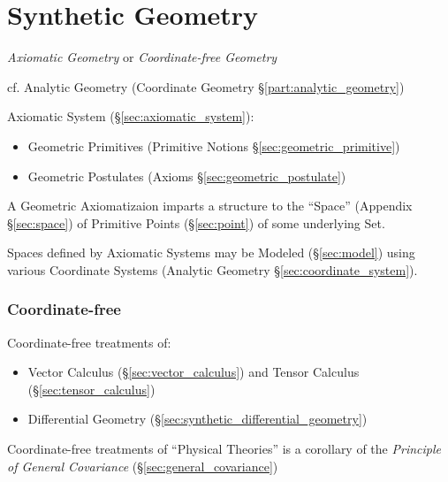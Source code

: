 \part{Synthetic Geometry}\label{part:synthetic_geometry}

\emph{Axiomatic Geometry} or \emph{Coordinate-free Geometry}

\fist cf. Analytic Geometry (Coordinate Geometry \S\ref{part:analytic_geometry})

Axiomatic System (\S\ref{sec:axiomatic_system}):
\begin{itemize}
  \item Geometric Primitives (Primitive Notions \S\ref{sec:geometric_primitive})
  \item Geometric Postulates (Axioms \S\ref{sec:geometric_postulate})
\end{itemize}
A Geometric Axiomatizaion imparts a structure to the ``Space'' (Appendix
\S\ref{sec:space}) of Primitive Points (\S\ref{sec:point}) of some underlying
Set.

\fist Spaces defined by Axiomatic Systems may be Modeled (\S\ref{sec:model})
using various Coordinate Systems (Analytic Geometry
\S\ref{sec:coordinate_system}).



\section{Coordinate-free}\label{sec:coordinate_free}

Coordinate-free treatments of:
\begin{itemize}
  \item Vector Calculus (\S\ref{sec:vector_calculus}) and Tensor Calculus
    (\S\ref{sec:tensor_calculus})
  \item Differential Geometry (\S\ref{sec:synthetic_differential_geometry})
\end{itemize}

Coordinate-free treatments of ``Physical Theories'' is a corollary of the
\emph{Principle of General Covariance} (\S\ref{sec:general_covariance})

